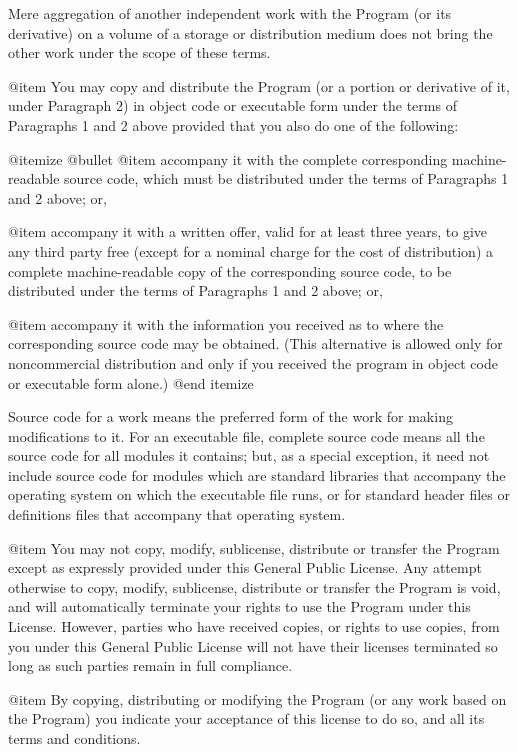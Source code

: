Mere aggregation of another independent work with the Program (or its
derivative) on a volume of a storage or distribution medium does not bring
the other work under the scope of these terms.

@item
You may copy and distribute the Program (or a portion or derivative of
it, under Paragraph 2) in object code or executable form under the terms of
Paragraphs 1 and 2 above provided that you also do one of the following:

@itemize @bullet
@item
accompany it with the complete corresponding machine-readable
source code, which must be distributed under the terms of
Paragraphs 1 and 2 above; or,

@item
accompany it with a written offer, valid for at least three
years, to give any third party free (except for a nominal charge
for the cost of distribution) a complete machine-readable copy of the
corresponding source code, to be distributed under the terms of
Paragraphs 1 and 2 above; or,

@item
accompany it with the information you received as to where the
corresponding source code may be obtained.  (This alternative is
allowed only for noncommercial distribution and only if you
received the program in object code or executable form alone.)
@end itemize

Source code for a work means the preferred form of the work for making
modifications to it.  For an executable file, complete source code means
all the source code for all modules it contains; but, as a special
exception, it need not include source code for modules which are standard
libraries that accompany the operating system on which the executable
file runs, or for standard header files or definitions files that
accompany that operating system.

@item
You may not copy, modify, sublicense, distribute or transfer the
Program except as expressly provided under this General Public License.
Any attempt otherwise to copy, modify, sublicense, distribute or transfer
the Program is void, and will automatically terminate your rights to use
the Program under this License.  However, parties who have received
copies, or rights to use copies, from you under this General Public
License will not have their licenses terminated so long as such parties
remain in full compliance.

@item
By copying, distributing or modifying the Program (or any work based
on the Program) you indicate your acceptance of this license to do so,
and all its terms and conditions.

